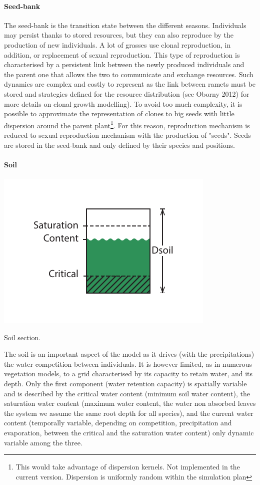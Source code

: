 \paragraph{Seed-bank} The seed-bank is the transition state between the different seasons. Individuals may persist thanks to stored resources, but they can also reproduce by the production of new individuals. A lot of grasses use clonal reproduction, in addition, or replacement of sexual reproduction. This type of reproduction is characterised by a persistent link between the newly produced individuals and the parent one that allows the two to communicate and exchange resources. Such dynamics are complex and costly to represent as the link between ramets must be stored and strategies defined for the resource distribution (see Oborny 2012) for more details on clonal growth modelling). To avoid too much complexity, it is possible to approximate the representation of clones to big seeds with little dispersion around the parent plant\footnote{This would take advantage of dispersion kernels. Not implemented in the current version. Dispersion is uniformly random within the simulation plan}. For this reason, reproduction mechanism is reduced to sexual reproduction mechanism with the production of "seeds". Seeds are stored in the seed-bank and only defined by their species and positions. 

\paragraph{Soil}
\begin{marginfigure}
\includegraphics{./Figures/soil_section_m.pdf}
\caption{Soil section.}
\end{marginfigure}
The soil is an important aspect of the model as it drives (with the precipitations) the water competition between individuals. It is however limited, as in numerous vegetation models, to a grid characterised by its capacity to retain water, and its depth. Only the first component (water retention capacity) is spatially variable and is described by the critical water content (minimum soil water content), the saturation water content (maximum water content, the water non absorbed leaves the system we assume the same root depth for all species), and the current water content (temporally variable, depending on competition, precipitation and evaporation, between the critical and the saturation water content) only dynamic variable among the three.

